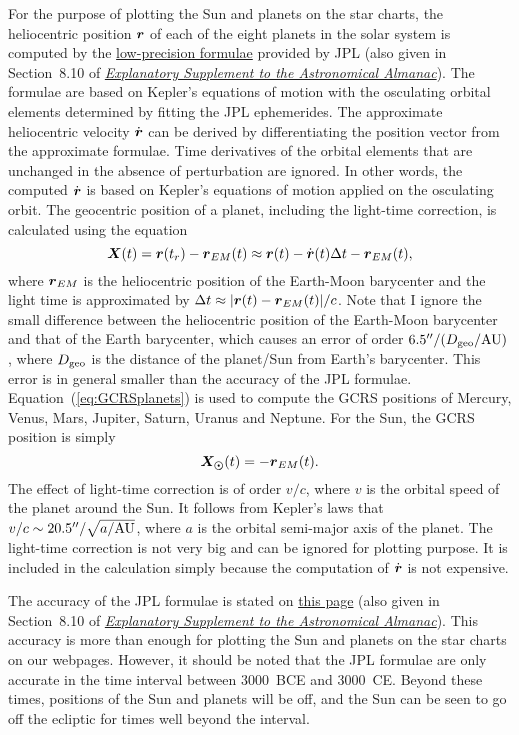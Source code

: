 \documentclass[12pt]{article}
\newcommand \beq {\begin{equation}}
\newcommand \eeq {\end{equation}}
\newcommand{\ve}[1]{\mbox{\boldmath $#1$}}
\newcommand{\expl}{\href{http://www.uscibooks.com/urban.htm}{\it Explanatory Supplement to the Astronomical Almanac}}
\begin{document}
For the purpose of plotting the Sun and planets on the star charts, the
heliocentric position $\ve{r}$ of each of the eight planets in the solar system 
is computed by the \href{https://ssd.jpl.nasa.gov/?planet_pos}{low-precision formulae} 
provided by JPL (also given in Section~8.10 of \expl). The formulae are based on 
Kepler's equations of motion with the osculating orbital elements determined 
by fitting the JPL ephemerides. The approximate heliocentric 
velocity $\dot{\ve{r}}$ can be derived by differentiating the position 
vector from the approximate formulae. Time derivatives of the orbital elements 
that are unchanged in the absence of perturbation are ignored. In other words, 
the computed $\dot{\ve{r}}$ is based on Kepler's equations of motion applied 
on the osculating orbit.
The geocentric position of a planet, including the light-time correction, is calculated 
using the equation 
\beq
  \ve{X}(t) = \ve{r}(t_r) - \ve{r}_{EM}(t) 
\approx \ve{r}(t) - \dot{\ve{r}}(t) \Delta t - \ve{r}_{EM}(t) ,
\label{eq:GCRSplanets}
\eeq
where $\ve{r}_{EM}$ is the heliocentric position of the 
Earth-Moon barycenter and the light time is approximated by 
$\Delta t \approx |\ve{r}(t) - \ve{r}_{EM}(t)|/c$. 
Note that I ignore the small difference between the heliocentric position of 
the Earth-Moon barycenter and that of the Earth barycenter, which causes 
an error of order $6.5''/(D_{\rm geo}/{\rm AU})$, where $D_{\rm geo}$ is the distance of the 
planet/Sun from Earth's barycenter. This error is in general smaller than the accuracy 
of the JPL formulae. 
Equation~(\ref{eq:GCRSplanets}) is used to compute the GCRS positions 
of Mercury, Venus, Mars, Jupiter, Saturn, Uranus and Neptune. For the Sun, 
the GCRS position is simply 
\beq
  \ve{X_{\odot}}(t) = -\ve{r}_{EM}(t) .
\label{eq:GCRSsun}
\eeq
The effect of light-time correction is of order $v/c$, 
where $v$ is the orbital speed of the planet around the Sun. It follows from 
Kepler's laws that $v/c \sim 20.5''/\sqrt{a/{\rm AU}}$, where $a$ is the orbital 
semi-major axis of the planet. The light-time correction is 
not very big and can be ignored for plotting purpose. It is included 
in the calculation simply because the computation of $\dot{\ve{r}}$ is 
not expensive.

The accuracy of the JPL formulae is stated on 
\href{https://ssd.jpl.nasa.gov/?planet_pos}{this page} (also given in Section~8.10 
of \expl). This accuracy is more than enough for plotting the Sun and planets 
on the star charts 
on our webpages. However, it should be noted that 
the JPL formulae are only accurate in the time interval between 3000~BCE and 
3000~CE. Beyond these times, positions of the Sun and planets will be off, and 
the Sun can be seen to go off the ecliptic for times well beyond the interval.
\end{document}
